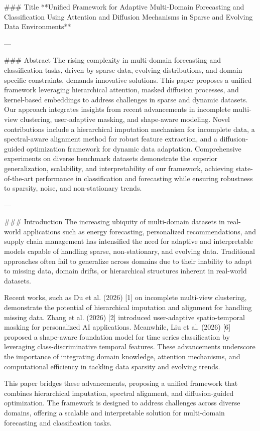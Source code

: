 ### Title  
**Unified Framework for Adaptive Multi-Domain Forecasting and Classification Using Attention and Diffusion Mechanisms in Sparse and Evolving Data Environments**

---

### Abstract  
The rising complexity in multi-domain forecasting and classification tasks, driven by sparse data, evolving distributions, and domain-specific constraints, demands innovative solutions. This paper proposes a unified framework leveraging hierarchical attention, masked diffusion processes, and kernel-based embeddings to address challenges in sparse and dynamic datasets. Our approach integrates insights from recent advancements in incomplete multi-view clustering, user-adaptive masking, and shape-aware modeling. Novel contributions include a hierarchical imputation mechanism for incomplete data, a spectral-aware alignment method for robust feature extraction, and a diffusion-guided optimization framework for dynamic data adaptation. Comprehensive experiments on diverse benchmark datasets demonstrate the superior generalization, scalability, and interpretability of our framework, achieving state-of-the-art performance in classification and forecasting while ensuring robustness to sparsity, noise, and non-stationary trends.

---

### Introduction  
The increasing ubiquity of multi-domain datasets in real-world applications such as energy forecasting, personalized recommendations, and supply chain management has intensified the need for adaptive and interpretable models capable of handling sparse, non-stationary, and evolving data. Traditional approaches often fail to generalize across domains due to their inability to adapt to missing data, domain drifts, or hierarchical structures inherent in real-world datasets.  

Recent works, such as Du et al. (2026) [1] on incomplete multi-view clustering, demonstrate the potential of hierarchical imputation and alignment for handling missing data. Zhang et al. (2026) [2] introduced user-adaptive spatio-temporal masking for personalized AI applications. Meanwhile, Liu et al. (2026) [6] proposed a shape-aware foundation model for time series classification by leveraging class-discriminative temporal features. These advancements underscore the importance of integrating domain knowledge, attention mechanisms, and computational efficiency in tackling data sparsity and evolving trends.  

This paper bridges these advancements, proposing a unified framework that combines hierarchical imputation, spectral alignment, and diffusion-guided optimization. The framework is designed to address challenges across diverse domains, offering a scalable and interpretable solution for multi-domain forecasting and classification tasks.

